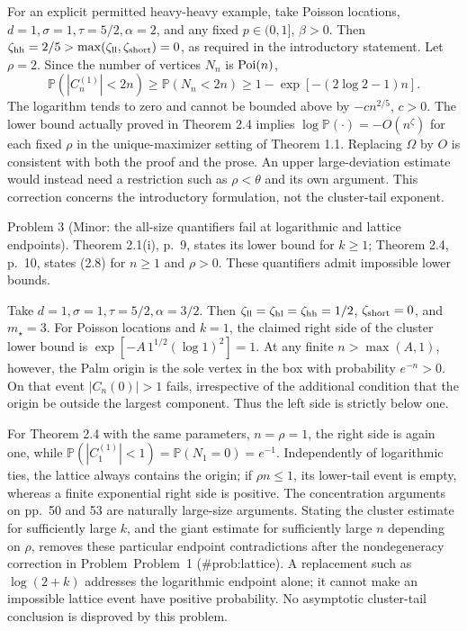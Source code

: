 \documentclass[10pt]{article}
\begin{document}
For an explicit permitted heavy-heavy example, take Poisson locations, \(d=1,\sigma=1,\tau=5/2,\alpha=2\), and any fixed \(p\in(0,1]\), \(\beta>0\). Then \(\zeta_{\rm hh}=2/5>\max(\zeta_{\rm ll},\zeta_{\rm short})=0\), as required in the introductory statement. Let \(\rho=2\). Since the number of vertices \(N_n\) is \({\rm Poi}(n)\), \[\mathbb P(|C_n^{(1)}|<2n)\geq \mathbb P(N_n<2n)
 \geq1-\exp[-(2\log2-1)n].\] The logarithm tends to zero and cannot be bounded above by \(-c n^{2/5}\), \(c>0\). The lower bound actually proved in Theorem 2.4 implies \(\log\mathbb P(\cdot)=-O(n^\zeta)\) for each fixed \(\rho\) in the unique-maximizer setting of Theorem 1.1. Replacing \(\Omega\) by \(O\) is consistent with both the proof and the prose. An upper large-deviation estimate would instead need a restriction such as \(\rho<\theta\) and its own argument. This correction concerns the introductory formulation, not the cluster-tail exponent.\par
Problem 3 (Minor: the all-size quantifiers fail at logarithmic and lattice endpoints).  Theorem 2.1(i), p. 9, states its lower bound for \(k\geq1\); Theorem 2.4, p. 10, states (2.8) for \(n\geq1\) and \(\rho>0\). These quantifiers admit impossible lower bounds.\par
Take \(d=1,\sigma=1,\tau=5/2,\alpha=3/2\). Then \(\zeta_{\rm ll}=\zeta_{\rm hl}=\zeta_{\rm hh}=1/2\), \(\zeta_{\rm short}=0\), and \(m_\star=3\). For Poisson locations and \(k=1\), the claimed right side of the cluster lower bound is \(\exp[-A\,1^{1/2}(\log1)^2]=1\). At any finite \(n>\max(A,1)\), however, the Palm origin is the sole vertex in the box with probability \(e^{-n}>0\). On that event \(|C_n(0)|>1\) fails, irrespective of the additional condition that the origin be outside the largest component. Thus the left side is strictly below one.\par
For Theorem 2.4 with the same parameters, \(n=\rho=1\), the right side is again one, while \(\mathbb P(|C_1^{(1)}|<1)=\mathbb P(N_1=0)=e^{-1}\). Independently of logarithmic ties, the lattice always contains the origin; if \(\rho n\leq1\), its lower-tail event is empty, whereas a finite exponential right side is positive. The concentration arguments on pp. 50 and 53 are naturally large-size arguments. Stating the cluster estimate for sufficiently large \(k\), and the giant estimate for sufficiently large \(n\) depending on \(\rho\), removes these particular endpoint contradictions after the nondegeneracy correction in Problem Problem 1 (\#prob:lattice). A replacement such as \(\log(2+k)\) addresses the logarithmic endpoint alone; it cannot make an impossible lattice event have positive probability. No asymptotic cluster-tail conclusion is disproved by this problem.\par
\end{document}
